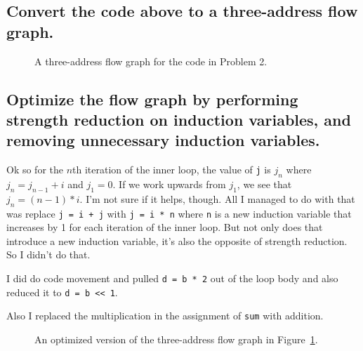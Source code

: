 \subsection{Convert the code above to a three-address flow graph.}
\begin{figure}[H]
\centering
	
\caption{A three-address flow graph for the code in Problem 2.}
\label{fig:2-b}
\end{figure}

\subsection{Optimize the flow graph by performing strength reduction on induction variables, and removing unnecessary induction variables.}

Ok so for the $n$th iteration of the inner loop, the value of \texttt{j} is $j_n$ where $j_n = j_{n-1} + i$ and $j_1 = 0$.
If we work upwards from $j_1$, we see that $j_n = (n-1)*i$.
I'm not sure if it helps, though.
All I managed to do with that was replace \texttt{j = i + j} with \texttt{j = i * n} where \texttt{n} is a new induction variable that increases by 1 for each iteration of the inner loop.
But not only does that introduce a new induction variable, it's also the opposite of strength reduction.
So I didn't do that.

I did do code movement and pulled \texttt{d = b * 2} out of the loop body and also reduced it to \texttt{d = b << 1}.

Also I replaced the multiplication in the assignment of \texttt{sum} with addition.

\begin{figure}[H]
\centering
	
\caption{An optimized version of the three-address flow graph in Figure~\ref{fig:2-b}.}
\label{fig:2-c}
\end{figure}
